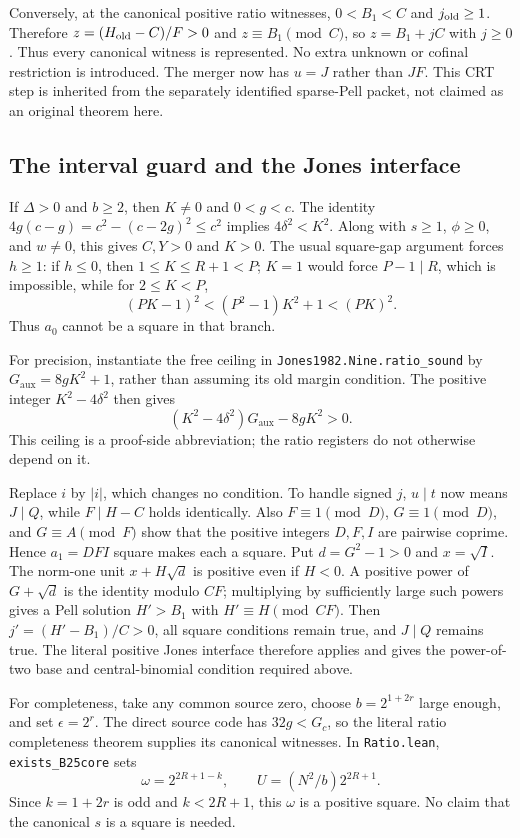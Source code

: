 Conversely, at the canonical positive ratio witnesses, $0<B_1<C$ and
$j_{\rm old}\ge1$. Therefore $z=(H_{\rm old}-C)/F>0$ and
$z\equiv B_1\pmod C$, so $z=B_1+jC$ with $j\ge0$. Thus every
canonical witness is represented. No extra unknown or cofinal restriction is
introduced. The merger now has $u=J$ rather than $JF$. This CRT step is
inherited from the separately identified sparse-Pell packet, not claimed as
an original theorem here.

\subsection{The interval guard and the Jones interface}
If $\Delta>0$ and $b\ge2$, then $K\ne0$ and
$0<g<c$. The identity $4g(c-g)=c^2-(c-2g)^2\le c^2$ implies
$4\delta^2<K^2$. Along with $s\ge1$, $\phi\ge0$, and $w\ne0$, this gives
$C,Y>0$ and $K>0$. The usual square-gap argument forces $h\ge1$:
if $h\le0$, then $1\le K\le R+1<P$; $K=1$ would force $P-1\mid R$,
which is impossible, while for $2\le K<P$,
\[
 (PK-1)^2<(P^2-1)K^2+1<(PK)^2.
\]
Thus $a_0$ cannot be a square in that branch.

For precision, instantiate the free ceiling in
\texttt{Jones1982.Nine.ratio\_sound} by
$G_{\mathrm{aux}}=8gK^2+1$, rather than assuming its old margin condition.
The positive integer $K^2-4\delta^2$ then gives
\[
 (K^2-4\delta^2)G_{\mathrm{aux}}-8gK^2>0.
\]
This ceiling is a proof-side abbreviation; the ratio registers do not
otherwise depend on it.

Replace $i$ by $|i|$, which changes no condition. To handle signed $j$,
$u\mid t$ now means $J\mid Q$, while $F\mid H-C$ holds identically. Also
$F\equiv1\pmod D$, $G\equiv1\pmod D$, and $G\equiv A\pmod F$ show
that the positive integers $D,F,I$ are pairwise coprime.
Hence $a_1=DFI$ square makes each a square. Put $d=G^2-1>0$ and
$x=\sqrt I$. The norm-one unit $x+H\sqrt d$ is positive even if $H<0$.
A positive power of $G+\sqrt d$ is the identity modulo $CF$; multiplying by
sufficiently large such powers gives a Pell solution $H'>B_1$ with
$H'\equiv H\pmod{CF}$. Then $j'=(H'-B_1)/C>0$, all square conditions
remain true, and $J\mid Q$ remains true. The literal positive Jones interface
therefore applies and gives the power-of-two base and central-binomial
condition required above.

For completeness, take any common source zero, choose
$b=2^{1+2r}$ large enough, and set $\epsilon=2^r$. The direct source code
has $32g<G_c$, so the literal ratio completeness theorem supplies its
canonical witnesses. In \texttt{Ratio.lean}, \texttt{exists\_B25core} sets
\[
 \omega=2^{2R+1-k},\qquad U=(N^2/b)2^{2R+1}.
\]
Since $k=1+2r$ is odd and $k<2R+1$, this $\omega$ is a positive square.
No claim that the canonical $s$ is a square is needed.

